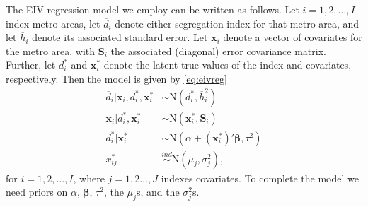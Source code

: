 \documentclass[12pt]{article}
\begin{document}
The EIV regression model we employ can be written as follows. Let $i=1,2,\dots,I$ index metro areas, let $\overline{d}_i$ denote either segregation index for that metro area, and let $\overline{h}_i$ denote its associated standard error. Let $\bm{x}_i$ denote a vector of covariates for the metro area, with $\bm{S}_i$ the associated (diagonal) error covariance matrix. Further, let $d_i^*$ and $\bm{x}_i^*$ denote the latent true values of the index and covariates, respectively. Then the model is given by \eqref{eq:eivreg}
\begin{align}
  \overline{d}_i | \bm{x}_i, d_i^*, \bm{x}_i^* &\sim \mathrm{N}(d_i^*, \overline{h}_i^2) \nonumber\\
  \bm{x}_i | d_i^*, \bm{x}_i^* &\sim \mathrm{N}(\bm{x}_i^*, \bm{S}_i) \nonumber\\
  d_i^* | \bm{x}^*_i & \sim \mathrm{N}(\alpha + (\bm{x}_i^*)'\bm{\beta}, \tau^2)\nonumber\\
  x_{ij}^* & \stackrel{ind}{\sim} \mathrm{N}(\mu_j, \sigma_j^2), \label{eq:eivreg}
\end{align}
for $i=1,2,\dots,I$, where $j=1,2\dots,J$ indexes covariates. To complete the model we need priors on $\alpha$, $\bm{\beta}$, $\tau^2$, the $\mu_j$s, and the $\sigma_j^2$s.
\end{document}
